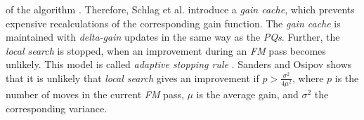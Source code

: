 of the algorithm \cite{papa2007hypergraph}. Therefore, Schlag et al. \cite{akhremtsev2017engineering,
schlag2016k} introduce a \emph{gain cache}, which prevents
expensive recalculations of the corresponding gain function. The \emph{gain cache} is maintained
with \emph{delta-gain} updates in the same way as the \emph{PQs}. Further, the \emph{local search}
is stopped, when an improvement during an \emph{FM} pass becomes unlikely. This model is
called \emph{adaptive stopping rule} \cite{akhremtsev2017engineering}. Sanders and
Osipov \cite{osipov2010n} shows that it is unlikely that \emph{local search} gives an improvement if
$p > \frac{\sigma^2}{4\mu^2}$, where $p$ is the number of moves in the current \emph{FM} pass,
$\mu$ is the average gain, and $\sigma^2$ the corresponding variance.
